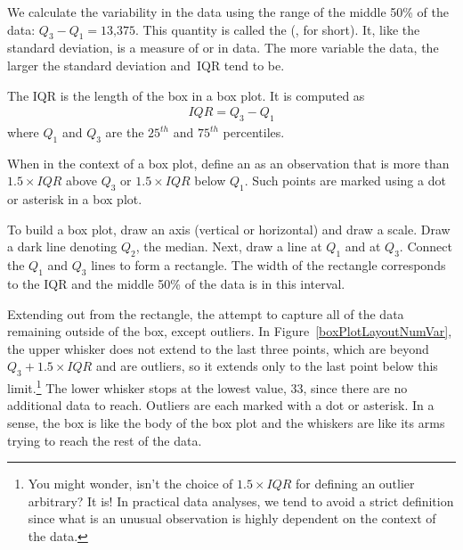 We calculate the variability in the data using the range of the middle 50\% of the data: $Q_3 - Q_1 = \text{13,375}$. This quantity is called the  (, for short). It, like the standard deviation, is a measure of  or  in data. The more variable the data, the larger the standard deviation and~IQR tend to be.

\begin{termBox}{
The IQR is the length of the box in a box plot. It is computed as
\begin{eqnarray*}
IQR = Q_3 - Q_1
\end{eqnarray*}
where $Q_1$ and $Q_3$ are the $25^{th}$ and $75^{th}$ percentiles.}
\end{termBox}

\begin{termBox}{
When in the context of a box plot, define an  as an \mbox{observation} that is more than $1.5 \times IQR$ above $Q_3$ or $1.5 \times IQR$ below $Q_1$. Such points are marked using a dot or asterisk in a box plot.}
\end{termBox}

To build a box plot, draw an axis (vertical or horizontal) and draw a scale. Draw a dark line denoting $Q_2$, the median. Next, draw a line at $Q_1$ and at $Q_3$. Connect the $Q_1$ and $Q_3$ lines to form a rectangle. The width of the rectangle corresponds to the IQR and the middle 50\% of the data is in this interval.

Extending out from the rectangle, the  attempt to capture all of the data remaining outside of the box, except outliers. In Figure~\ref{boxPlotLayoutNumVar}, the upper whisker does not extend to the last three points, which are beyond $Q_3 + 1.5\times IQR$ and are outliers, so it extends only to the last point below this limit.\footnote{You might wonder, isn't the choice of $1.5 \times IQR$ for defining an outlier arbitrary? It is! In practical data analyses, we tend to avoid a strict definition since what is an unusual observation is highly dependent on the context of the data.} The lower whisker stops at the lowest value, 33, since there are no additional data to reach. Outliers are each marked with a dot or asterisk. In a sense, the box is like the body of the box plot and the whiskers are like its arms trying to reach the rest of the data.

